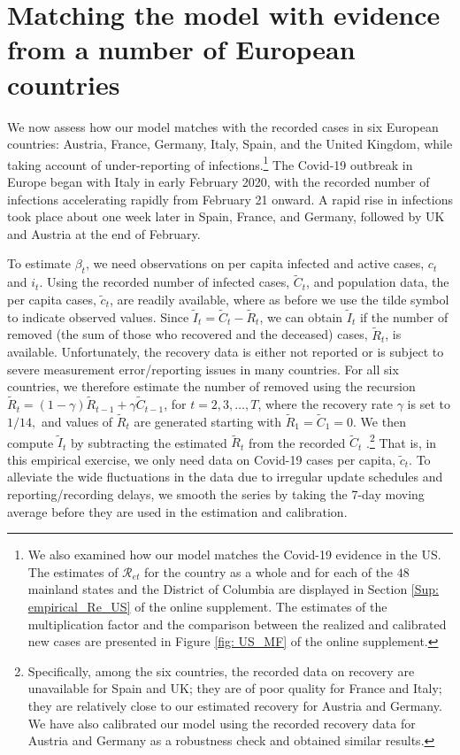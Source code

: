 \documentclass[12pt]{article}
\begin{document}
\section{Matching the model with evidence from a number of European countries
\label{Sec: empirical}}

We now assess how our model matches with the recorded cases in six European
countries: Austria, France, Germany, Italy, Spain, and the United Kingdom,
while taking account of under-reporting of infections.\footnote{We also
examined how our model matches the Covid-19 evidence in the US. The estimates
of $\mathcal{R}_{et}$ for the country as a whole and for each of the $48$
mainland states and the District of Columbia are displayed in Section
\ref{Sup: empirical_Re_US} of the online supplement. The estimates of the
multiplication factor and the comparison between the realized and calibrated
new cases are presented in Figure \ref{fig: US_MF} of the online supplement.}
The Covid-19 outbreak in Europe began with Italy in early February 2020, with
the recorded number of infections accelerating rapidly from February 21
onward. A rapid rise in infections took place about one week later in Spain,
France, and Germany, followed by UK and Austria at the end of February.

To estimate $\beta_{t}$, we need observations on per capita infected and
active cases, $c_{t}$ and $i_{t}$. Using the recorded number of infected
cases, $\tilde{C}_{t}$, and population data, the per capita cases, $\tilde
{c}_{t}$, are readily available, where as before we use the tilde symbol to
indicate observed values. Since $\tilde{I}_{t}=\tilde{C}_{t}-\tilde{R}_{t}$,
we can obtain $\tilde{I}_{t}$ if the number of removed (the sum of those who
recovered and the deceased) cases, $\tilde{R}_{t}$, is available.
Unfortunately, the recovery data is either not reported or is subject to
severe measurement error/reporting issues in many countries. For all six
countries, we therefore estimate the number of removed using the recursion
$\tilde{R}_{t}=\left(  1-\gamma\right)  \tilde{R}_{t-1}+\gamma\tilde{C}_{t-1}%
$, for $t=2,3,\ldots,T$, where the recovery rate $\gamma$ is set to $1/14,$
and values of $\tilde{R}_{t}$ are generated starting with $\tilde{R}%
_{1}=\tilde{C}_{1}=0$. We then compute $\tilde{I}_{t}$ by subtracting the
estimated $\tilde{R}_{t}$ from the recorded $\tilde{C}_{t}$%
.\footnote{Specifically, among the six countries, the recorded data on
recovery are unavailable for Spain and UK; they are of poor quality for France
and Italy; they are relatively close to our estimated recovery for Austria and
Germany. We have also calibrated our model using the recorded recovery data
for Austria and Germany as a robustness check and obtained similar results.}
That is, in this empirical exercise, we only need data on Covid-19 cases per
capita, $\tilde{c}_{t}$. To alleviate the wide fluctuations in the data due to
irregular update schedules and reporting/recording delays, we smooth the
series by taking the 7-day moving average before they are used in the
estimation and calibration.
\end{document}
